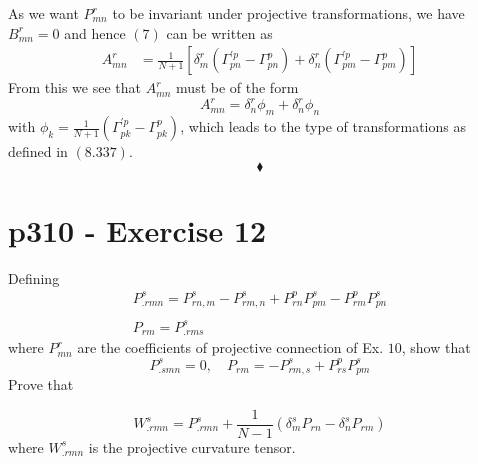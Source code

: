 As we want $P^r_{mn}$ to be invariant under projective transformations, we have $B^r_{mn}=0$ and hence $(7)$ can be written as
\begin{align}
A^r_{mn}&=\frac{1}{N+1}\left[\delta^r_m\left( \Gamma^{'p}_{pn}-\Gamma^p_{pn}\right) +  \delta^r_n \left(\Gamma^{'p}_{pm} -   \Gamma^p_{pm} \right)\right]
\end{align}
From this we see that $A^r_{mn}$ must be of the form
$$A^r_{mn}=\delta^r_n\phi_m+\delta^r_n\phi_n$$
with $\phi_k = \frac{1}{N+1}\left( \Gamma^{'p}_{pk}-\Gamma^p_{pk}\right) $, which leads to the type of transformations as defined in $\mathbf{(8.337)}$.
$$\blacklozenge$$
\newpage


\section{p310 - Exercise 12}
\begin{tcolorbox}
Defining  $$\begin{matrix}
P^s_{.rmn}=P^s_{rn,m}-P^s_{rm,n}+P^p_{rn}P^s_{pm}-P^p_{rm}P^s_{pn} \\\\
P_{rm}=P^s_{.rms}
\end{matrix}$$
where  $P^r_{mn}$ are the coefficients of projective connection of Ex. $10$, show that
$$P^s_{.smn}=0,\quad P_{rm}=-P^s_{rm,s}+P^p_{rs}P^s_{pm}  $$
Prove that 

$$W^s_{.rmn}=P^s_{.rmn}+\frac{1}{N-1}\left(\delta^s_m P_{rn}-\delta^s_nP_{rm}\right) $$
where $W^s_{.rmn}$ is the projective curvature tensor.
\end{tcolorbox}

